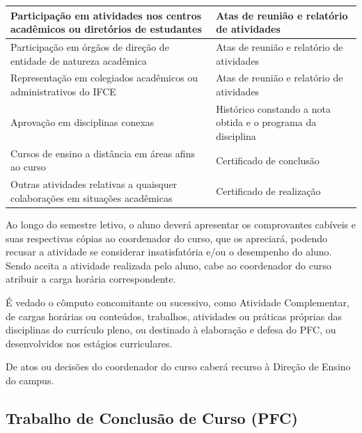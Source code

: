 \begin{longtable}{|p{8.5cm}|p{5.5cm}|}
	Participação em atividades nos centros acadêmicos ou diretórios de estudantes & Atas de reunião e relatório de atividades \\
	
	\hline
	
	Participação em órgãos de direção de entidade de natureza acadêmica & Atas de reunião e relatório de atividades \\
	
	\hline
	
	Representação em colegiados acadêmicos ou administrativos do IFCE & Atas de reunião e relatório de atividades \\
	
	\hline
	
	Aprovação em disciplinas conexas & Histórico constando a nota obtida e o programa da disciplina\\
	
	\hline
	
	Cursos de ensino a distância em áreas afins ao curso & Certificado de conclusão\\
	
	\hline
	
	Outras atividades relativas a quaisquer colaborações em situações acadêmicas & Certificado de realização\\
	
	\hline
	
\end{longtable} 

Ao longo do semestre letivo, o aluno deverá apresentar os comprovantes cabíveis e suas respectivas cópias ao coordenador do curso, que os apreciará, podendo recusar a atividade se considerar insatisfatória e/ou o desempenho do aluno. Sendo aceita a atividade realizada pelo aluno, cabe ao coordenador do curso atribuir a carga horária correspondente.


É vedado o cômputo concomitante ou sucessivo, como Atividade Complementar, de cargas horárias ou conteúdos, trabalhos, atividades ou práticas próprias das disciplinas do currículo pleno, ou destinado à elaboração e defesa do PFC, ou desenvolvidos nos estágios curriculares.

De atos ou decisões do coordenador do curso caberá recurso à Direção de Ensino do campus.

\subsection{Trabalho de Conclusão de Curso (PFC)}


